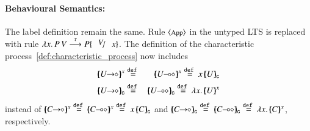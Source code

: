 \paragraph{Behavioural Semantics:}
The label definition remain the same.
Rule ${\footnotesize \langle \textrm{App} \rangle}$ in the untyped LTS
is replaced with rule
$\appl{\abs{x}{P}}{V} \by{\tau} P \subst{V}{x}$.
The definition of the
characteristic process~\ref{def:characteristic_process}
now includes
\begin{eqnarray*}
\mapchar{\shot{U}}{x} & \defeq & \mapchar{\lhot{U}}{x} \defeq \appl{x}{\omapchar{U}} \\
\omapchar{\shot{U}} & \defeq & \omapchar{\lhot{U}} \defeq \abs{x}{\mapchar{U}{x}}
\end{eqnarray*}
instead of $\mapchar{\shot{C}}{x} \defeq \mapchar{\lhot{C}}{x} \defeq \appl{x}{\omapchar{C}}$
and
$\omapchar{\shot{C}} \defeq \omapchar{\lhot{C}} \defeq \abs{x}{\mapchar{C}{x}}$, respectively.
\begin{comment}
%
\begin{definition}[Characteristic Process]\rm
	\noi Let name $u$ and type $U$; then we define the {\em characteristic process}:
	$\mapchar{U}{u}$ and the {\em characteristic value} $\omapchar{U}$ as:
%
	\[
	\begin{array}{cc}
		\begin{array}{rclcl}
			\mapchar{\btinp{U} S}{u} &\defeq& \binp{u}{x} (\mapchar{S}{u} \Par \mapchar{U}{x})
			\\
			\mapchar{\btout{U} S}{u} &\defeq& \bout{u}{\omapchar{U}} \mapchar{S}{u} %
			\\
			\mapchar{\btsel{l : S}}{u} &\defeq& \bsel{u}{l} \mapchar{S}{u}
			\\
			\mapchar{\btbra{l_i: S_i}_{i \in I}}{u} &\defeq& \bbra{u}{l_i: \mapchar{S_i}{u}}_{i \in I}
			\\
			\mapchar{\tvar{t}}{u} &\defeq& \varp{X}_{\vart{t}}
			\\
			\mapchar{\trec{t}{S}}{u} &\defeq& \recp{X_{\vart{t}}}{\mapchar{S}{u}}
			\\
			\mapchar{\tinact}{u} &\defeq& \inact
			\\
		\end{array}
		&
		\begin{array}{rcrclcl}
			&&\mapchar{\chtype{S}}{u} &\defeq& \bout{u}{\omapchar{S}} \inact
			\\
			&&\mapchar{\chtype{L}}{u} &\defeq& \bout{u}{\omapchar{L}} \inact
			\\
			\dk{\mapchar{\shot{U}}{x}} &\defeq& \dk{\mapchar{\lhot{U}}{x}} &\defeq& \dk{\appl{x}{\omapchar{U}}}
			\\
			\\
			&&\omapchar{S} &\defeq& s && s \textrm{ fresh}
			\\
			\omapchar{\chtype{S}} &\defeq& \omapchar{\chtype{L}} &\defeq& a && a \textrm{ fresh}
			\\
			\dk{\omapchar{\shot{U}}} &\defeq& \dk{\omapchar{\lhot{U}}} &\defeq& \dk{\abs{x}{\mapchar{U}{x}}}
		\end{array}
	\end{array}
	\]
\end{definition}
%
\end{comment}
